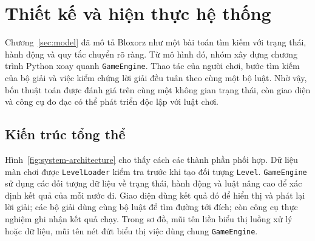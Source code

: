 \clearpage
\section{Thiết kế và hiện thực hệ thống}
\label{sec:implementation}

Chương~\ref{sec:model} đã mô tả Bloxorz như một bài toán tìm kiếm với trạng
thái, hành động và quy tắc chuyển rõ ràng. Từ mô hình đó, nhóm xây dựng chương
trình Python xoay quanh \texttt{GameEngine}. Thao tác của người chơi, bước tìm
kiếm của bộ giải và việc kiểm chứng lời giải đều tuân theo cùng một bộ luật. Nhờ
vậy, bốn thuật toán được đánh giá trên cùng một không gian trạng thái, còn giao
diện và công cụ đo đạc có thể phát triển độc lập với luật chơi.

\subsection{Kiến trúc tổng thể}

Hình~\ref{fig:system-architecture} cho thấy cách các thành phần phối hợp. Dữ
liệu màn chơi được \texttt{LevelLoader} kiểm tra trước khi tạo đối tượng
\texttt{Level}. \texttt{GameEngine} sử dụng các đối tượng dữ liệu về trạng thái,
hành động và luật nâng cao để xác định kết quả của mỗi nước đi. Giao diện dùng kết quả đó để
hiển thị và phát lại lời giải; các bộ giải dùng cùng bộ luật để tìm đường tới
đích; còn công cụ thực nghiệm ghi nhận kết quả chạy. Trong sơ đồ, mũi tên liền
biểu thị luồng xử lý hoặc dữ liệu, mũi tên nét đứt biểu thị việc dùng chung
\texttt{GameEngine}.

